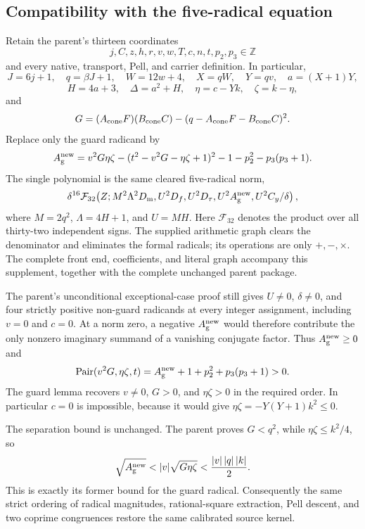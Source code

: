 \subsection{Compatibility with the five-radical equation}

Retain the parent's thirteen coordinates
\[
 j,C,z,h,r,v,w,T,c,n,t,p_2,p_3\in\mathbb Z
\]
and every native, transport, Pell, and carrier definition. In particular,
\[
 J=6j+1,\quad q=\beta J+1,\quad W=12w+4,\quad
 X=qW,\quad Y=qv,\quad a=(X+1)Y,
\]
\[
 H=4a+3,\quad \Delta=a^2+H,\quad
 \eta=c-Yk,\quad \zeta=k-\eta,
\]
and
\[
 G=(A_{\rm cone}F)(B_{\rm cone}C)
    -(q-A_{\rm cone}F-B_{\rm cone}C)^2.
\]
Replace only the guard radicand by
\begin{equation}
 A_{\rm g}^{\rm new}
 =v^2G\eta\zeta-(t^2-v^2G-\eta\zeta+1)^2
    -1-p_2^2-p_3(p_3+1).
 \label{eq:guard-new-radicand}
\end{equation}
The single polynomial is the same cleared five-radical norm,
\begin{equation}
 \delta^{16}\mathcal F_{32}\!\left(
 Z;M^2\Lambda^2D_{\rm m},U^2D_f,U^2D_\tau,
 U^2A_{\rm g}^{\rm new},U^2C_y/\delta\right),
 \label{eq:guard-new-norm}
\end{equation}
where $M=2q^2$, $\Lambda=4H+1$, and $U=MH$.
Here $\mathcal F_{32}$ denotes the product over all thirty-two
independent signs. The supplied arithmetic graph clears the denominator
and eliminates the formal radicals; its operations are only $+,-,\times$.
The complete front end, coefficients, and literal graph accompany this
supplement, together with the complete unchanged parent package.

The parent's unconditional exceptional-case proof still gives
$U\ne0$, $\delta\ne0$, and four strictly positive non-guard radicands
at every integer assignment, including $v=0$ and $c=0$.
At a norm zero, a negative $A_{\rm g}^{\rm new}$ would therefore
contribute the only nonzero imaginary summand of a vanishing conjugate
factor. Thus $A_{\rm g}^{\rm new}\ge0$ and
\[
 \operatorname{Pair}(v^2G,\eta\zeta,t)
 =A_{\rm g}^{\rm new}+1+p_2^2+p_3(p_3+1)>0.
\]
The guard lemma recovers $v\ne0$, $G>0$, and $\eta\zeta>0$ in
the required order. In particular $c=0$ is impossible, because it would
give $\eta\zeta=-Y(Y+1)k^2\le0$.

The separation bound is unchanged. The parent proves $G<q^2$, while
$\eta\zeta\le k^2/4$, so
\[
 \sqrt{A_{\rm g}^{\rm new}}
 <|v|\sqrt{G\eta\zeta}<\frac{|v|\,|q|\,|k|}{2}.
\]
This is exactly its former bound for the guard radical. Consequently
the same strict ordering of radical magnitudes, rational-square
extraction, Pell descent, and two coprime congruences restore the same
calibrated source kernel.

